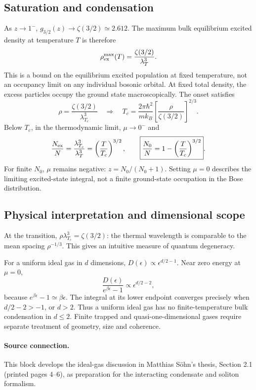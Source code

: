 \subsection*{Saturation and condensation}
As $z\to1^-$, $g_{3/2}(z)\to\zeta(3/2)\simeq2.612$. The maximum bulk equilibrium excited density at temperature $T$ is therefore
\[
\rho_{\rm ex}^{\max}(T)=\frac{\zeta(3/2)}{\lambda_T^3}.
\]
This is a bound on the equilibrium excited population at fixed temperature, not an occupancy limit on any individual bosonic orbital. At fixed total density, the excess particles occupy the ground state macroscopically. The onset satisfies
\[
\rho=\frac{\zeta(3/2)}{\lambda_{T_c}^3}
\quad\Longrightarrow\quad
\boxed{T_c=\frac{2\pi\hbar^2}{mk_B}
\left[\frac{\rho}{\zeta(3/2)}\right]^{2/3}}.
\]
Below $T_c$, in the thermodynamic limit, $\mu\to0^-$ and
\[
\frac{N_{\rm ex}}{N}
=\frac{\lambda_{T_c}^3}{\lambda_T^3}
=\left(\frac{T}{T_c}\right)^{3/2},
\qquad
\boxed{\frac{N_0}{N}=1-\left(\frac{T}{T_c}\right)^{3/2}}.
\]
For finite $N_0$, $\mu$ remains negative: $z=N_0/(N_0+1)$. Setting $\mu=0$ describes the limiting excited-state integral, not a finite ground-state occupation in the Bose distribution.

\subsection*{Physical interpretation and dimensional scope}
At the transition, $\rho\lambda_{T_c}^3=\zeta(3/2)$: the thermal wavelength is comparable to the mean spacing $\rho^{-1/3}$. This gives an intuitive measure of quantum degeneracy.

For a uniform ideal gas in $d$ dimensions, $D(\epsilon)\propto\epsilon^{d/2-1}$. Near zero energy at $\mu=0$,
\[
\frac{D(\epsilon)}{e^{\beta\epsilon}-1}
\propto \epsilon^{d/2-2},
\]
because $e^{\beta\epsilon}-1\simeq\beta\epsilon$. The integral at its lower endpoint converges precisely when $d/2-2>-1$, or $d>2$. Thus a uniform ideal gas has no finite-temperature bulk condensation in $d\le2$. Finite trapped and quasi-one-dimensional gases require separate treatment of geometry, size and coherence.

\paragraph{Source connection.}
This block develops the ideal-gas discussion in Matthias S\"ohn's thesis, Section 2.1 (printed pages 4--6), as preparation for the interacting condensate and soliton formalism.
